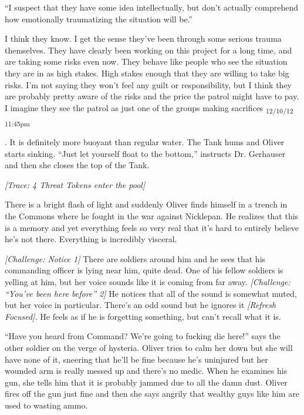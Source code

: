 {``I suspect that they have some idea intellectually, but don't actually comprehend how emotionally traumatizing the situation will be.''

I think they know.  I get the sense they've been through some serious trauma themselves.  They have clearly been working on this project for a long time, and are taking some risks even now.  They behave like people who see the situation they are in as high stakes.  High stakes enough that they are willing to take big risks.  I'm not saying they won't feel any guilt or responsibility, but I think they are probably pretty aware of the risks and the price the patrol might have to pay.  I imagine they see the patrol as just one of the groups making sacrifices \textsubscript{12/10/12 11:45pm}}.  It is definitely more buoyant than regular water.  The Tank hums and Oliver starts sinking.  ``Just let yourself float to the bottom,'' instructs Dr. Gerhauser and then she closes the top of the Tank.




\textit{{[}Trace: 4 Threat Tokens enter the pool{]}}



There is a bright flash of light and suddenly Oliver finds himself in a trench in the Commons where he fought in the war against Nicklepan.  He realizes that this is a memory and yet everything feels so very real that it's hard to entirely believe he's not there.  Everything is incredibly visceral.



\textit{{[}Challenge: Notice 1{]}} There are soldiers around him and he sees that his commanding officer is lying near him, quite dead.  One of his fellow soldiers is yelling at him, but her voice sounds like it is coming from far away.  \textit{{[}Challenge: ``You've been here before'' 2{]}} He notices that all of the sound is somewhat muted, but her voice in particular.  There's an odd sound but he ignores it \textit{{[}Refresh Focused{]}.} He feels as if he is forgetting something, but can't recall what it is.



``Have you heard from Command?  We're going to fucking die here!'' says the other soldier on the verge of hysteria.  Oliver tries to calm her down but she will have none of it, sneering that he'll be fine because he's uninjured but her wounded arm is really messed up and there's no medic.  When he examines his gun, she tells him that it is probably jammed due to all the damn dust.  Oliver fires off the gun just fine and then she says angrily that wealthy guys like him are used to wasting ammo. 



